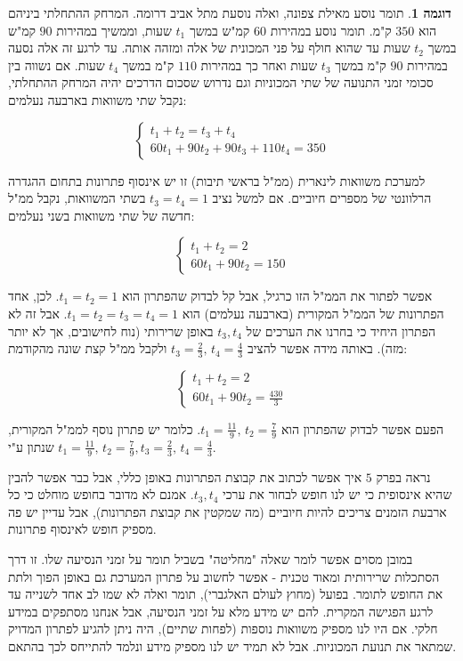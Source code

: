 \documentclass[12pt]{report}
\theoremstyle{plain}
\theoremstyle{definition}
\newtheorem{example}[theorem]{דוגמה}
\newcommand{\0}{\mathbf{0}}
\begin{document}
\begin{example}
תומר נוסע מאילת צפונה, ואלה נוסעת מתל אביב דרומה. המרחק
ההתחלתי ביניהם הוא $350$ ק"מ. תומר נוסע במהירות
$60$ קמ"ש במשך $t_{1}$ שעות, וממשיך במהירות
$90$ קמ"ש במשך $t_{2}$ שעות עד שהוא חולף על
פני המכונית של אלה ומזהה אותה. עד לרגע זה אלה נסעה במהירות $90$
ק"מ במשך $t_{3}$ שעות ואחר כך במהירות $110$
ק"מ במשך $t_{4}$ שעות. אם נשווה בין סכומי זמני
התנועה של שתי המכוניות וגם נדרוש שסכום הדרכים יהיה המרחק ההתחלתי,
נקבל שתי משוואות בארבעה נעלמים:

$$
\begin{cases}
t_{1}+t_{2}=t_{3}+t_{4}\\
60t_{1}+90t_{2}+90t_{3}+110t_{4}=350
\end{cases}
$$

למערכת משוואות לינארית (ממ"ל בראשי תיבות) זו יש אינסוף
פתרונות בתחום ההגדרה הרלוונטי של מספרים חיוביים. אם למשל נציב $t_{3}=t_{4}=1$
בשתי המשוואות, נקבל ממ"ל חדשה של שתי משוואות בשני נעלמים:

$$
\begin{cases}
t_{1}+t_{2}=2\\
60t_{1}+90t_{2}=150
\end{cases}
$$

אפשר לפתור את הממ"ל הזו כרגיל, אבל קל לבדוק שהפתרון
הוא $t_{1}=t_{2}=1$. לכן, אחד הפתרונות של הממ"ל
המקורית (בארבעה נעלמים) הוא $t_{1}=t_{2}=t_{3}=t_{4}=1$. אבל
זה לא הפתרון היחיד כי בחרנו את הערכים של $t_{3},t_{4}$ באופן
שרירותי (נוח לחישובים, אך לא יותר מזה). באותה מידה אפשר להציב $t_{3}=\frac{2}{3},\,t_{4}=\frac{4}{3}$
ולקבל ממ"ל קצת שונה מהקודמת:

$$
\begin{cases}
t_{1}+t_{2}=2\\
60t_{1}+90t_{2}=\frac{430}{3}
\end{cases}
$$

הפעם אפשר לבדוק שהפתרון הוא $t_{1}=\frac{11}{9},\,t_{2}=\frac{7}{9}$.
כלומר יש פתרון נוסף לממ"ל המקורית, שנתון ע"י
$t_{1}=\frac{11}{9},\,t_{2}=\frac{7}{9}\text{,}\,t_{3}=\frac{2}{3},\,t_{4}=\frac{4}{3}$.
\end{example}

נראה בפרק
$5$ 
איך אפשר לכתוב את קבוצת הפתרונות באופן
כללי, אבל כבר אפשר להבין שהיא אינסופית כי יש לנו חופש לבחור את ערכי
$t_{3},t_{4}$. אמנם לא מדובר בחופש מוחלט כי כל ארבעת הזמנים צריכים
להיות חיוביים (מה שמקטין את קבוצת הפתרונות), אבל עדיין יש פה מספיק
חופש לאינסוף פתרונות.

במובן מסוים אפשר לומר שאלה "מחליטה" בשביל
תומר על זמני הנסיעה שלו. זו דרך הסתכלות שרירותית ומאוד טכנית - אפשר
לחשוב על פתרון המערכת גם באופן הפוך ולתת את החופש לתומר. בפועל (מחוץ
לעולם האלגברי), תומר ואלה לא שמו לב אחד לשנייה עד לרגע הפגישה המקרית.
להם יש מידע מלא על זמני הנסיעה, אבל אנחנו מסתפקים במידע חלקי. אם היו
לנו מספיק משוואות נוספות (לפחות שתיים), היה ניתן להגיע לפתרון המדויק
שמתאר את תנועת המכוניות. אבל לא תמיד יש לנו מספיק מידע ונלמד להתייחס
לכך בהתאם.
\end{document}
